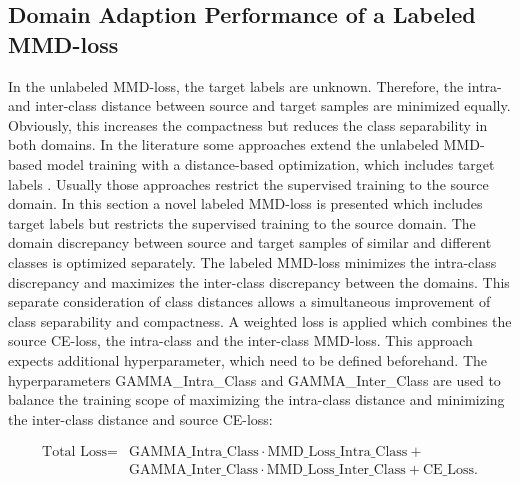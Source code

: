 \subsection{Domain Adaption Performance of a Labeled MMD-loss} \label{sec:Differences of labeled and unlabeled MMD loss}

In the unlabeled MMD-loss, the target labels are unknown. Therefore, the intra- and inter-class distance between source and target samples are minimized equally. Obviously, this increases the compactness but reduces the class separability in both domains. In the literature some approaches extend the unlabeled MMD-based model training with a distance-based optimization, which includes target labels \cite{Pandhare2021}. Usually those approaches restrict the supervised training to the source domain. In this section a novel labeled MMD-loss is presented which includes target labels but restricts the supervised training to the source domain. The domain discrepancy between source and target samples of similar and different classes is optimized separately. The labeled MMD-loss minimizes the intra-class discrepancy and maximizes the inter-class discrepancy between the domains. This separate consideration of class distances allows a simultaneous improvement of class separability and compactness. A weighted loss is applied which combines the source CE-loss, the intra-class and the inter-class MMD-loss. This approach expects additional hyperparameter, which need to be defined beforehand. The hyperparameters GAMMA\_Intra\_Class and GAMMA\_Inter\_Class are used to balance the training scope of maximizing the intra-class distance and minimizing the inter-class distance and source CE-loss:

\begin{equation}
\begin{split}
    \mbox{Total Loss} = & \mbox{GAMMA\_Intra\_Class}  \cdot \mbox{MMD\_Loss\_Intra\_Class} + \\
                              &\mbox{GAMMA\_Inter\_Class} \cdot \mbox{MMD\_Loss\_Inter\_Class} + \mbox{CE\_Loss}.
\end{split}
\end{equation}

